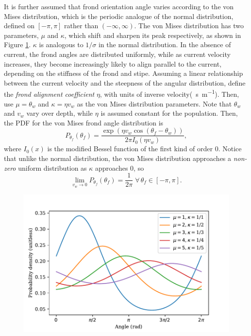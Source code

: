 \documentclass[ms,cpyr,lof,lot]{uathesis}
\begin{document}
It is further assumed that frond orientation angle varies according to the von Mises distribution, which is the periodic analogue of the normal distribution, defined on $[-\pi,\pi]$ rather than $(-\infty,\infty)$.
The von Mises distribution has two parameters, $\mu$ and $\kappa$, which shift and sharpen its peak respectively, as shown in Figure \ref{fig:vonmises}.
$\kappa$ is analogous to $1/\sigma$ in the normal distribution.
In the absence of current, the frond angles are distributed uniformly, while as current velocity increases, they become increasingly likely to align parallel to the current, depending on the stiffness of the frond and stipe.
Assuming a linear relationship between the current velocity and the steepness of the angular distribution, define the \textit{frond alignment coefficient} $\eta$, with units of inverse velocity(\SI{}{\s\per\m}).
Then, use $\mu = \theta_w$ and $\kappa = \eta v_w$ as the von Mises distribution parameters.
Note that $\theta_w$ and $v_w$ vary over depth, while $\eta$ is assumed constant for the population.
Then, the PDF for the von Mises frond angle distribution is
\begin{equation*}
	P_{\theta_f}(\theta_f) = \frac{\exp\left(\eta v_w\cos(\theta_f-\theta_w)\right)}{2\pi I_0(\eta v_w)},
\end{equation*}
where $I_0(x)$ is the modified Bessel function of the first kind of order 0.
Notice that unlike the normal distribution, the von Mises distribution approaches a \textit{non-zero} uniform distribution as $\kappa$ approaches 0, so
\begin{equation*}
	\displaystyle \lim_{v_w \to 0}P_{\theta_f}(\theta_f) = \frac{1}{2\pi} \;\forall\, \theta_f \in [-\pi,\pi].
\end{equation*}

\begin{figure}[h]
	\centering
	\includegraphics[width=6in]{vonmises}
	\label{fig:vonmises}
\end{figure}
\end{document}
